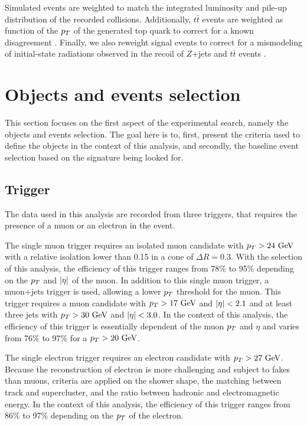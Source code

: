    Simulated events are weighted to match the integrated luminosity and pile-up distribution
    of the recorded collisions. Additionally, $t\bar{t}$ events are weighted as function of
    the $p_T$ of the generated top quark to correct for a known disagreement \cite{topPtReweighting}.
    Finally, we also reweight signal events to correct for a mismodeling of initial-state
    radiations observed in the recoil of $Z$+jets and $t\bar{t}$ events \cite{ISRmodelingDominick}.

    \section{Objects and events selection \label{sec:analysis_objectAndEventSelection}}

    This section focuses on the first aspect of the experimental search, namely the objects
    and events selection. The goal here is to, first, present the criteria used to define the
    objects in the context of this analysis, and secondly, the baseline event selection based
    on the signature being looked for.

        \subsection{Trigger}

    The data used in this analysis are recorded from three triggers, that requires the
    presence of a muon or an electron in the event.

    The single muon trigger requires an isolated muon candidate with $p_T > 24~\text{GeV}$
    with a relative isolation lower than 0.15 in a cone of $\Delta R = 0.3$. With the selection
    of this analysis, the efficiency of this trigger ranges from 78\% to 95\% depending
    on the $p_T$ and $\left| \eta \right|$ of the muon. In addition to this single muon trigger, a
    muon+jets trigger is used, allowing a lower $p_T$ threshold for the muon. This trigger
    requires a muon candidate with $p_T > 17~\text{GeV}$ and $\left| \eta \right| < 2.1$ and at least three
    jets with $p_T > 30~\text{GeV}$ and $\left| \eta \right| < 3.0$. In the context of this analysis, the
    efficiency of this trigger is essentially dependent of the muon $p_T$ and $\eta$ and
    varies from 76\% to 97\% for a $p_T > 20~\text{GeV}$.

    The single electron trigger requires an electron candidate with $p_T > 27~\text{GeV}$. Because
    the reconstruction of electron is more challenging and subject to fakes than muons,
    criteria are applied on the shower shape, the matching between track and supercluster,
    and the ratio between hadronic and electromagnetic energy. In the context of this analysis,
    the efficiency of this trigger ranges from 86\% to 97\% depending on the $p_T$ of the
    electron.

